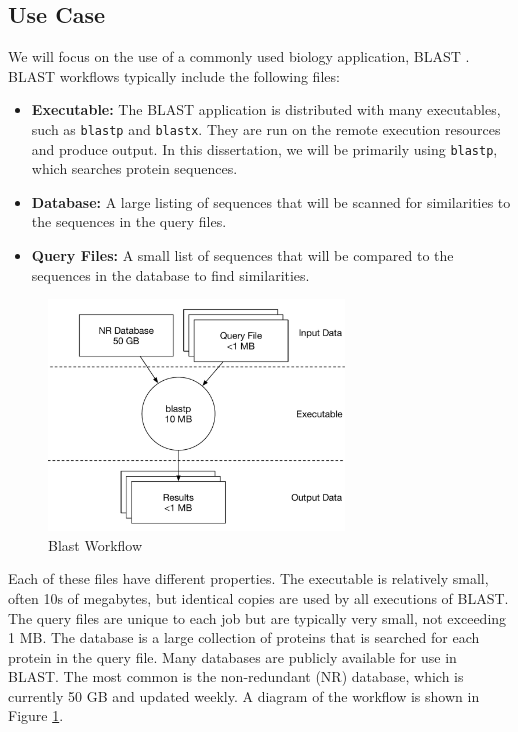 \subsection{Use Case}
We will focus on the use of a commonly used biology application, BLAST \cite{altschul1990basic}.  BLAST workflows typically include the following files:

\begin{itemize}
	\item \textbf{Executable:} The BLAST application is distributed with many executables, such as \texttt{blastp} and \texttt{blastx}.  They are run on the remote execution resources and produce output.  In this dissertation, we will be primarily using \texttt{blastp}, which searches protein sequences.
	\item \textbf{Database:}  A large listing of sequences that will be scanned for similarities to the sequences in the query files.
	\item \textbf{Query Files:} A small list of sequences that will be compared to the sequences in the database to find similarities.  
\end{itemize}

\begin{figure}
	\centering
	\includegraphics[width=0.7\textwidth]{images/BlastWorkflow}
	\caption{Blast Workflow}
	\label{fig:blastworkflow}
\end{figure}

Each of these files have different properties.  The executable is relatively small, often 10s of megabytes, but identical copies are used by all executions of BLAST.  The query files are unique to each job but are typically very small, not exceeding 1 MB.  The database is a large collection of proteins that is searched for each protein in the query file.  Many databases are publicly available for use in BLAST.  The most common is the non-redundant (NR) database, which is currently 50 GB and updated weekly.  A diagram of the workflow is shown in Figure \ref{fig:blastworkflow}.

